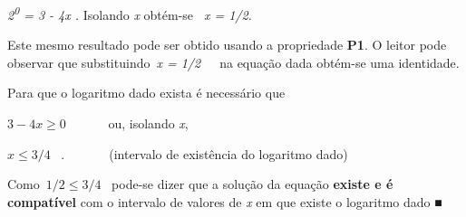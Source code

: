 \documentclass[12pt]{article}
\begin{document}
\begin{enumerate}[label*={\fontsize{14pt}{14pt}\selectfont \textbf{\arabic*.}}]
\begin{adjustwidth}{0.49in}{0.0in}
\begin{justify}
\textit{2\textsuperscript{0} = 3 - 4x . }Isolando \textit{x} obtém-se \textit{\  x = 1/2.}
\end{justify}\par

\end{adjustwidth}

\begin{adjustwidth}{0.49in}{0.0in}
\begin{justify}
Este mesmo resultado pode ser obtido usando a propriedade \textbf{P1}. O leitor pode observar que substituindo\  \textit{x = 1/2}\ \ \  na equação dada obtém-se uma identidade.
\end{justify}\par

\end{adjustwidth}

\begin{adjustwidth}{0.49in}{0.0in}
\begin{justify}
Para que o logaritmo dado exista é necessário que
\end{justify}\par

\end{adjustwidth}

\begin{adjustwidth}{0.49in}{0.0in}
\begin{justify}
 \( 3-4x \geq 0 \) \ \ \ \ \ \  ou, isolando \textit{x},
\end{justify}\par

\end{adjustwidth}

\begin{adjustwidth}{0.49in}{0.0in}
\begin{justify}
 \( x \leq 3/4 \) \  .\ \ \ \ \ \ \  (intervalo de existência do logaritmo dado)
\end{justify}\par

\end{adjustwidth}

\begin{adjustwidth}{0.49in}{0.0in}
\begin{justify}
Como\   \( 1/2 \leq 3/4 \) \  pode-se dizer que a solução da equação \textbf{existe e é compatível} com o intervalo de valores de \textit{x} em que existe o logaritmo dado ■
\end{justify}\par


\end{adjustwidth}
\end{enumerate}
\end{document}
